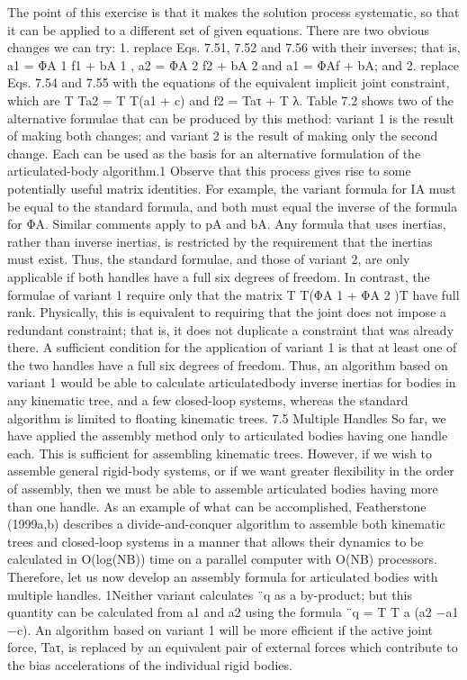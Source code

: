 The point of this exercise is that it makes the solution process systematic, so that it can be applied to a different set of given equations. There are two obvious changes we can try: 1. replace Eqs. 7.51, 7.52 and 7.56 with their inverses; that is, a1 = ΦA 1 f1 + bA 1 , a2 = ΦA 2 f2 + bA 2 and a1 = ΦAf + bA; and 2. replace Eqs. 7.54 and 7.55 with the equations of the equivalent implicit joint constraint, which are T Ta2 = T T(a1 + c) and f2 = Taτ + T λ. Table 7.2 shows two of the alternative formulae that can be produced by this method: variant 1 is the result of making both changes; and variant 2 is the result of making only the second change. Each can be used as the basis for an alternative formulation of the articulated-body algorithm.1 Observe that this process gives rise to some potentially useful matrix identities. For example, the variant formula for IA must be equal to the standard formula, and both must equal the inverse of the formula for ΦA. Similar comments apply to pA and bA. Any formula that uses inertias, rather than inverse inertias, is restricted by the requirement that the inertias must exist. Thus, the standard formulae, and those of variant 2, are only applicable if both handles have a full six degrees of freedom. In contrast, the formulae of variant 1 require only that the matrix T T(ΦA 1 + ΦA 2 )T have full rank. Physically, this is equivalent to requiring that the joint does not impose a redundant constraint; that is, it does not duplicate a constraint that was already there. A sufficient condition for the application of variant 1 is that at least one of the two handles have a full six degrees of freedom. Thus, an algorithm based on variant 1 would be able to calculate articulatedbody inverse inertias for bodies in any kinematic tree, and a few closed-loop systems, whereas the standard algorithm is limited to floating kinematic trees. 7.5 Multiple Handles So far, we have applied the assembly method only to articulated bodies having one handle each. This is sufficient for assembling kinematic trees. However, if we wish to assemble general rigid-body systems, or if we want greater flexibility in the order of assembly, then we must be able to assemble articulated bodies having more than one handle. As an example of what can be accomplished, Featherstone (1999a,b) describes a divide-and-conquer algorithm to assemble both kinematic trees and closed-loop systems in a manner that allows their dynamics to be calculated in O(log(NB)) time on a parallel computer with O(NB) processors. Therefore, let us now develop an assembly formula for articulated bodies with multiple handles. 1Neither variant calculates ¨q as a by-product; but this quantity can be calculated from a1 and a2 using the formula ¨q = T T a (a2 −a1 −c). An algorithm based on variant 1 will be more efficient if the active joint force, Taτ, is replaced by an equivalent pair of external forces which contribute to the bias accelerations of the individual rigid bodies.

